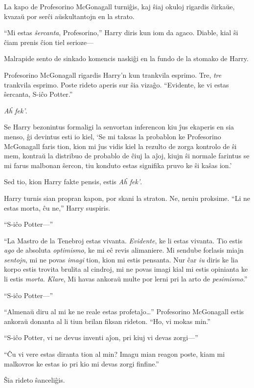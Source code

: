 La kapo de Profesorino McGonagall turniĝis, kaj ŝiaj okuloj rigardis
ĉirkaŭe, kvazaŭ por serĉi aŭskultantojn en la strato.

``Mi estas \emph{ŝercanta}, Profesorino,'' Harry diris kun iom da
agaco. Diable, kial ŝi ĉiam prenis ĉion tiel serioze—

Malrapide sento de sinkado komencis naskiĝi en la fundo de la stomako
de Harry.

Profesorino McGonagall rigardis Harry'n kun trankvila esprimo. Tre,
\emph{tre} trankvila esprimo. Poste rideto aperis sur ŝia
vizaĝo. ``Evidente, ke vi estas ŝercanta, S-iĉo Potter.''

\emph{Aĥ fek'}.

Se Harry bezonintus formaligi la senvortan inferencon kiu ĵus ekaperis
en sia menso, ĝi devintus esti io kiel, `Se mi taksas la probablon ke
Profesorino McGonagall faris tion, kion mi ĵus vidis kiel la rezulto
de zorga kontrolo de ŝi mem, kontraŭ la distribuo de probablo de ĉiuj
la aĵoj, kiujn ŝi normale farintus se mi farus malbonan ŝercon, tiu
konduto estas signifika pruvo ke ŝi kaŝas ion.'

Sed tio, kion Harry fakte pensis, estis \emph{Aĥ fek'}.

Harry turnis sian propran kapon, por skani la straton. Ne, neniu
proksime. ``Li ne estas morta, ĉu ne,'' Harry suspiris.

``S-iĉo Potter—''

``La Mastro de la Tenebroj estas vivanta. \emph{Evidente}, ke li estas
vivanta.  Tio estis \emph{ago} de absoluta \emph{optimismo}, ke mi eĉ
revis alimaniere. Mi sendube forlasis miajn \emph{sentojn}, mi ne
povas \emph{imagi} tion, kion mi estis pensanta. Nur ĉar \emph{iu}
diris ke lia korpo estis trovita brulita al cindroj, mi ne povas imagi
kial mi estis opinianta ke li estis \emph{morta}. \emph{Klare}, Mi
havas ankoraŭ multe por lerni pri la arto de \emph{pesimismo}.''

``S-iĉo Potter—''

``Almenaŭ diru al mi ke ne reale estas profetaĵo\ldots'' Profesorino
McGonagall estis ankoraŭ donanta al li tiun brilan fiksan
rideton. ``Ho, vi mokas min.''

``S-iĉo Potter, vi ne devus inventi aĵon, pri kiuj vi devas zorgi—''

``Ĉu vi vere estas diranta tion al min? Imagu mian reagon poste, kiam
mi malkovros ke estas io pri kio mi devas zorgi finfine.''

Ŝia rideto ŝanceliĝis.

